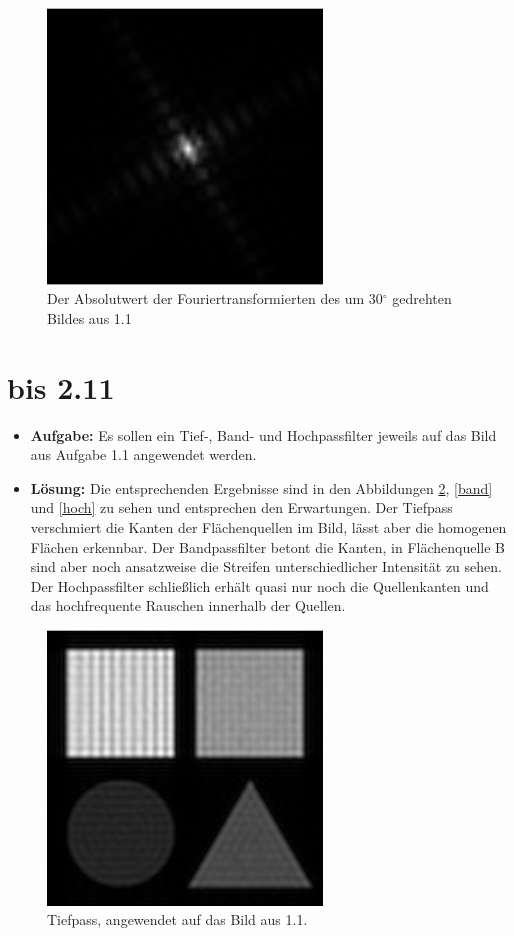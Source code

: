 \documentclass[12pt, a4paper, twoside]{report}
\begin{document}
\begin{figure}[h]
\centering
\includegraphics[width=0.65\textwidth]{../bilder/ft_rotation.png}
\caption{Der Absolutwert der Fouriertransformierten des um 30$^\circ$ gedrehten Bildes aus 1.1}
\label{ft_rot}
\end{figure}

\section{bis \hspace{2 pt} 2.11}
\begin{itemize}
\item \textbf{Aufgabe:} Es sollen ein Tief-, Band- und Hochpassfilter jeweils auf das Bild aus Aufgabe 1.1 angewendet werden.
\item \textbf{Lösung:} Die entsprechenden Ergebnisse sind in den Abbildungen \ref{tief}, \ref{band} und \ref{hoch} zu sehen und entsprechen den Erwartungen. Der Tiefpass verschmiert die Kanten der Flächenquellen im Bild, lässt aber die homogenen Flächen erkennbar. Der Bandpassfilter betont die Kanten, in Flächenquelle B sind aber noch ansatzweise die Streifen unterschiedlicher Intensität zu sehen. Der Hochpassfilter schließlich erhält quasi nur noch die Quellenkanten und das hochfrequente Rauschen innerhalb der Quellen.
\end{itemize}

\begin{figure}[h]
\centering
\includegraphics[width=0.65\textwidth]{../bilder/tiefpass.png}
\caption{Tiefpass, angewendet auf das Bild aus 1.1.}
\label{tief}
\end{figure}
\end{document}
